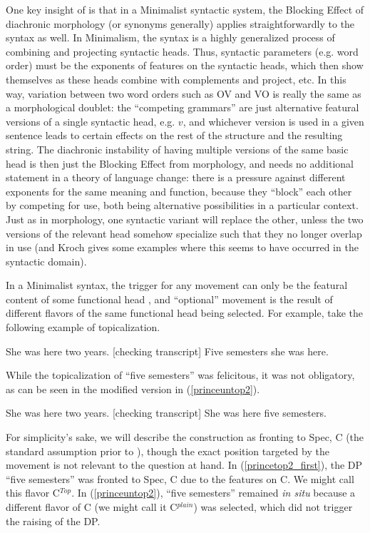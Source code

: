 One key insight of \citet{kroch1994} is that in a Minimalist syntactic system, the Blocking Effect of diachronic morphology (or synonyms generally) applies straightforwardly to the syntax as well.
In Minimalism, the syntax is a highly generalized process of combining and projecting syntactic heads.
Thus, syntactic parameters (e.g. word order) must be the exponents of features on the syntactic heads, which then show themselves as these heads combine with complements and project, etc.
In this way, variation between two word orders such as OV and VO is really the same as a morphological doublet: the ``competing grammars'' \citep{kroch1989} are just alternative featural versions of a single syntactic head, e.g. $v$, and whichever version is used in a given sentence leads to certain effects on the rest of the structure and the resulting string.
The diachronic instability of having multiple versions of the same basic head is then just the Blocking Effect from morphology, and needs no additional statement in a theory of language change: there is a pressure against different exponents for the same meaning and function, because they ``block'' each other by competing for use, both being alternative possibilities in a particular context.
Just as in morphology, one syntactic variant will replace the other, unless the two versions of the relevant head somehow specialize such that they no longer overlap in use (and Kroch gives some examples where this seems to have occurred in the syntactic domain).

In a Minimalist syntax, the trigger for any movement can only be the featural content of some functional head \citep{chomsky2000, chomsky2001}, and ``optional'' movement is the result of different flavors of the same functional head being selected.
For example, take the following example of topicalization.
\begin{exe}
\ex \label{princetop2_first} She was here two years.
[checking transcript] Five semesters she was here.\\
\citep[][8,9]{prince1999}
\end{exe}
While the topicalization of ``five semesters'' was felicitous, it was not obligatory, as can be seen in the modified version in (\ref{princeuntop2}).
\begin{exe}
\ex \label{princeuntop2} She was here two years.
[checking transcript] She was here five semesters.\\
\citep[Adapted from][8,9]{prince1999}
\end{exe}
For simplicity's sake, we will describe the construction as fronting to Spec, C (the standard assumption prior to \citealt{rizzi1997}), though the exact position targeted by the movement is not relevant to the question at hand.
In (\ref{princetop2_first}), the DP ``five semesters'' was fronted to Spec, C due to the features on C.
We might call this flavor C$^{Top}$.
In (\ref{princeuntop2}), ``five semesters'' remained \textsl{in situ} because a different flavor of C (we might call it C$^{plain}$) was selected, which did not trigger the raising of the DP.

